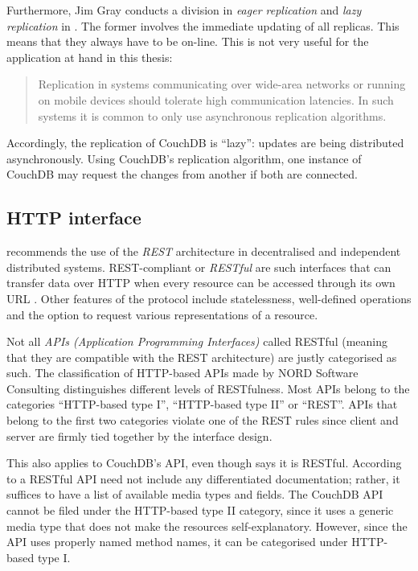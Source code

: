 Furthermore, Jim Gray conducts a division in \textit{eager replication} and \textit{lazy replication} in . The former involves the immediate updating of all replicas. This means that they always have to be on-line. This is not very useful for the application at hand in this thesis:

\begin{quote}
Replication in systems communicating over wide-area networks or running on mobile devices should tolerate high communication latencies. In such systems it is common to only use asynchronous replication algorithms. 
\end{quote}

Accordingly, the replication of CouchDB is \enquote{lazy}: updates are being distributed asynchronously. Using CouchDB's replication algorithm, one instance of CouchDB may request the changes from another if both are connected.



\subsection{HTTP interface}
\label{subsec:rest}

 recommends the use of the \textit{REST} architecture in decentralised and independent distributed systems. REST-compliant or \textit{RESTful} are such interfaces that can transfer data over HTTP  when every resource can be accessed through its own URL . Other features of the protocol include statelessness, well-defined operations and the option to request various representations of a resource.

Not all \textit{APIs (Application Programming Interfaces)} called RESTful (meaning that they are compatible with the REST architecture) are justly categorised as such. The classification of HTTP-based APIs made by NORD Software Consulting \cite{rest:classification} distinguishes different levels of RESTfulness. Most APIs belong to the categories \enquote{HTTP-based type I}, \enquote{HTTP-based type II} or \enquote{REST}. APIs that belong to the first two categories violate one of the REST rules since client and server are firmly tied together by the interface design.

This also applies to CouchDB's API, even though \cite{couch:overview} says it is RESTful. According to \cite{rest:couchapi} a RESTful API need not include any differentiated documentation; rather, it suffices to have a list of available media types and fields. The CouchDB API cannot be filed under the HTTP-based type II category, since it uses a generic media type that does not make the resources self-explanatory. However, since the API uses properly named method names, it can be categorised under HTTP-based type I.

